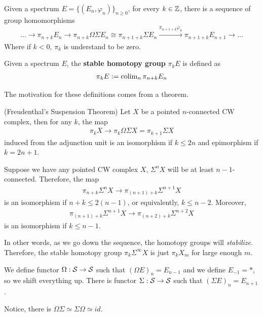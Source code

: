 Given a spectrum $E=\{(E_n, \varphi_n)\}_{n\geq 0}$, for every $k\in \mathbb{Z}$, there is a sequence of group homomorphisms
\begin{align*}
    ...\to \pi_{n+k}E_n\to\pi_{n+k}\Omega \Sigma E_{n}\cong\pi_{n+1+k}\Sigma E_{n}\xrightarrow{\pi_{n+1+k}\varphi_n} \pi_{n+1+k} E_{n+1}\to ...
\end{align*}
Where if $k<0$, $\pi_k$ is understand to be zero.
\begin{definition}
    Given a spectrum $E$, the \textbf{stable homotopy group} $\pi_k E$ is defined as
  \begin{align*}
        \pi_kE:=\operatorname{colim}_{n} \pi_{n+k}E_n
    \end{align*}
\end{definition}

The motivation for these definitions comes from a theorem.
\begin{theorem}
    (Freudenthal's Suspension Theorem)
    Let $X$ be a pointed $n$-connected CW complex, then for any $k$, the map
\begin{align*}
    \pi_kX\to \pi_{k}\Omega\Sigma X=\pi_{k+1}\Sigma X
\end{align*}induced from the adjunction unit is an isomorphism if $k\leq 2n$ and epimorphism if $k=2n+1$.
\end{theorem}

Suppose we have any pointed CW complex $X$, $\Sigma^{n}X$ will be at least $n-1$-connected. Therefore, the map
\begin{align*}
    \pi_{n+k}\Sigma^{n}X\to  \pi_{(n+1)+k}\Sigma^{n+1}X
\end{align*}is an isomorphism if $n+k\leq 2(n-1)$, or equivalently, $k\leq n-2$. Moreover,
\begin{align*}
    \pi_{(n+1)+k}\Sigma^{n+1}X\to \pi_{(n+2)+k}\Sigma^{n+2}X
\end{align*}is an isomorphism if $k\leq n-1$.

In other words, as we go down the sequence, the homotopy groups will \textit{stabilize}. Therefore, the stable homotopy group $\pi_k\Sigma^\infty X$ is just $\pi_k X_m$ for large enough $m$.


\begin{definition}
    We define functor $\Omega: \operatorname{\mathcal{S}}\to \operatorname{\mathcal{S}}$ such that $(\Omega E)_n=E_{n-1}$ and we define $E_{-1}=*$, so we shift everything up. There is functor $\Sigma:\operatorname{\mathcal{S}} \to \operatorname{\mathcal{S}}$ such that $(\Sigma E)_n=E_{n+1}$.
\end{definition}
Notice, there is $\Omega \Sigma \simeq \Sigma \Omega \simeq id$.


